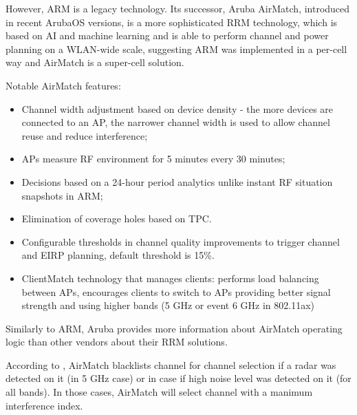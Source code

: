 However, ARM is a legacy technology. Its successor, Aruba AirMatch, introduced in recent ArubaOS versions, is a more sophisticated RRM technology, which is based on AI and machine learning and is able to perform channel and power planning on a WLAN-wide scale, suggesting ARM was implemented in a per-cell way and AirMatch is a super-cell solution.

Notable AirMatch features:

\begin{itemize}
    \item Channel width adjustment based on device density - the more devices are connected to an AP, the narrower channel width is used to allow channel reuse and reduce interference;
    \item APs measure RF environment for 5 minutes every 30 minutes;
    \item Decisions based on a 24-hour period analytics unlike instant RF situation snapshots in ARM;
    \item Elimination of coverage holes based on TPC.
    \item Configurable thresholds in channel quality improvements to trigger channel and EIRP planning, default threshold is 15\%.
    \item ClientMatch technology that manages clients: performs load balancing between APs, encourages clients to switch to APs providing better signal strength and using higher bands (5 GHz or event 6 GHz in 802.11ax)
\end{itemize}

Similarly to ARM, Aruba provides more information about AirMatch operating logic than other vendors about their RRM solutions.

According to \cite{ArubaOSUserGuide}, AirMatch blacklists channel for channel selection if a radar was detected on it (in 5 GHz case) or in case if high noise level was detected on it (for all bands). In those cases, AirMatch will select channel with a manimum interference index.

